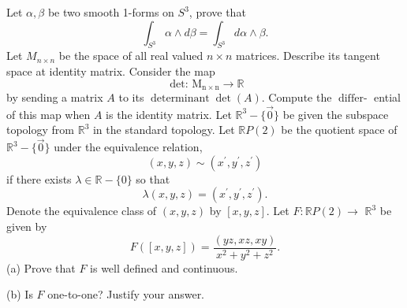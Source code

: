 \documentclass[10pt]{article}
\begin{document}
Let $\alpha, \beta$ be two smooth 1-forms on $S^{3}$, prove that
$$
\int_{S^{3}} \alpha \wedge d \beta=\int_{S^{3}} d \alpha \wedge \beta .
$$
\newpage
Let $M_{n \times n}$ be the space of all real valued $n \times n$ matrices. Describe its tangent space at identity matrix. Consider the map
$$
\text { det: } \mathrm{M}_{\mathrm{n} \times \mathrm{n}} \rightarrow \mathbb{R}
$$
by sending a matrix $A$ to its $\operatorname{determinant} \operatorname{det}(A)$. Compute the $\operatorname{differ-}$ ential of this map when $A$ is the identity matrix.
\newpage
Let $\mathbb{R}^{3}-\{\overrightarrow{0}\}$ be given the subspace topology from $\mathbb{R}^{3}$ in the standard topology. Let $\mathbb{R} P(2)$ be the quotient space of $\mathbb{R}^{3}-\{\overrightarrow{0}\}$ under the equivalence relation,
$$
(x, y, z) \sim\left(x^{\prime}, y^{\prime}, z^{\prime}\right)
$$
if there exists $\lambda \in \mathbb{R}-\{0\}$ so that
$$
\lambda(x, y, z)=\left(x^{\prime}, y^{\prime}, z^{\prime}\right) .
$$
Denote the equivalence class of $(x, y, z)$ by $[x, y, z]$. Let $F: \mathbb{R} P(2) \rightarrow$ $\mathbb{R}^{3}$ be given by
$$
F([x, y, z])=\frac{(y z, x z, x y)}{x^{2}+y^{2}+z^{2}} .
$$
(a) Prove that $F$ is well defined and continuous.

(b) Is $F$ one-to-one? Justify your answer.
\end{document}
